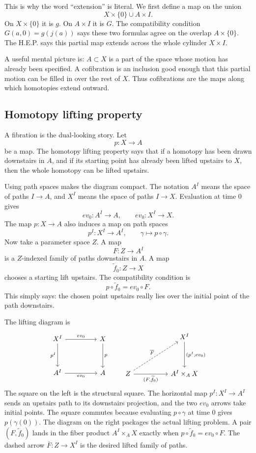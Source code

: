 This is why the word ``extension'' is literal.  We first define a map on the union
\[
  X\times\{0\}\cup A\times I.
\]
On \(X\times\{0\}\) it is \(g\).  On \(A\times I\) it is \(G\).  The compatibility condition \(G(a,0)=g(j(a))\) says these two formulas agree on the overlap \(A\times\{0\}\).  The H.E.P. says this partial map extends across the whole cylinder \(X\times I\).

A useful mental picture is: \(A\subset X\) is a part of the space whose motion has already been specified.  A cofibration is an inclusion good enough that this partial motion can be filled in over the rest of \(X\).  Thus cofibrations are the maps along which homotopies extend outward.

\subsection{Homotopy lifting property}

A fibration is the dual-looking story.  Let
\[
  p:X\to A
\]
be a map.  The homotopy lifting property says that if a homotopy has been drawn downstairs in \(A\), and if its starting point has already been lifted upstairs to \(X\), then the whole homotopy can be lifted upstairs.

Using path spaces makes the diagram compact.  The notation \(A^I\) means the space of paths \(I\to A\), and \(X^I\) means the space of paths \(I\to X\).  Evaluation at time \(0\) gives
\[
  ev_0:A^I\to A,
  \qquad
  ev_0:X^I\to X.
\]
The map \(p:X\to A\) also induces a map on path spaces
\[
  p^I:X^I\to A^I,\qquad \gamma\mapsto p\circ\gamma.
\]
Now take a parameter space \(Z\).  A map
\[
  F:Z\to A^I
\]
is a \(Z\)-indexed family of paths downstairs in \(A\).  A map
\[
  \widetilde f_0:Z\to X
\]
chooses a starting lift upstairs.  The compatibility condition is
\[
  p\circ \widetilde f_0=ev_0\circ F.
\]
This simply says: the chosen point upstairs really lies over the initial point of the path downstairs.

The lifting diagram is
\[
\begin{tikzcd}[column sep=4.6em,row sep=3.4em]
X^I \arrow[r,"ev_0"] \arrow[d,"p^I"']
  & X \arrow[d,"p"] \\
A^I \arrow[r,"ev_0"']
  & A
\end{tikzcd}
\qquad
\begin{tikzcd}[column sep=5.0em,row sep=3.8em]
& X^I \arrow[d,"{(p^I,ev_0)}"] \\
Z \arrow[ur,dashed,"\overline F"] \arrow[r,"{(F,\widetilde f_0)}"']
  & A^I\times_A X
\end{tikzcd}
\]
The square on the left is the structural square.  The horizontal map \(p^I:X^I\to A^I\) sends an upstairs path to its downstairs projection, and the two \(ev_0\) arrows take initial points.  The square commutes because evaluating \(p\circ\gamma\) at time \(0\) gives \(p(\gamma(0))\).  The diagram on the right packages the actual lifting problem.  A pair \((F,\widetilde f_0)\) lands in the fiber product \(A^I\times_A X\) exactly when \(p\circ\widetilde f_0=ev_0\circ F\).  The dashed arrow \(\overline F:Z\to X^I\) is the desired lifted family of paths.

